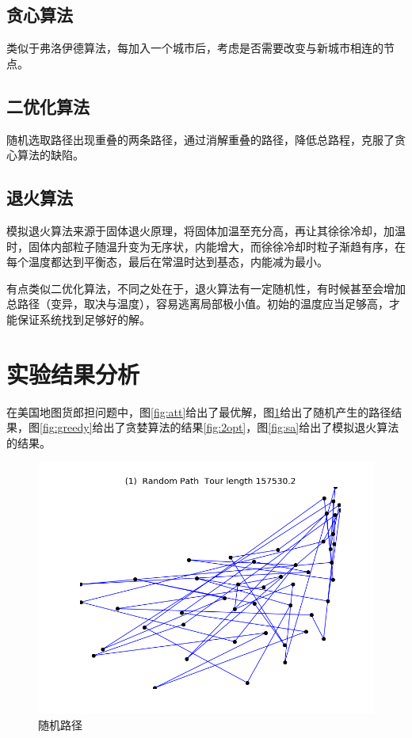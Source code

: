 \documentclass{article}
\newcommand{\huo}{货郎担问题}
\begin{document}
\begin{CJK}{UTF8}{gkai}
\subsection{贪心算法}
类似于弗洛伊德算法，每加入一个城市后，考虑是否需要改变与新城市相连的节点。\cite{gutin2007greedy}


\subsection{二优化算法}
随机选取路径出现重叠的两条路径，通过消解重叠的路径，降低总路程，克服了贪心算法的缺陷。\cite{croes1958method}


\subsection{退火算法}
模拟退火算法来源于固体退火原理，将固体加温至充分高，再让其徐徐冷却，加温时，固体内部粒子随温升变为无序状，内能增大，而徐徐冷却时粒子渐趋有序，在每个温度都达到平衡态，最后在常温时达到基态，内能减为最小。

有点类似二优化算法，不同之处在于，退火算法有一定随机性，有时候甚至会增加总路径（变异，取决与温度），容易逃离局部极小值。初始的温度应当足够高，才能保证系统找到足够好的解。\cite{grefenstette1985genetic}



\section{实验结果分析}
	在美国地图\huo 中，图\ref{fig:att}给出了最优解，图\ref{fig:rand}给出了随机产生的路径结果，图\ref{fig:greedy}给出了贪婪算法的结果\ref{fig:2opt}，图\ref{fig:sa}给出了模拟退火算法的结果。
\begin{figure}[!h]
	\centering
	\includegraphics[width=.7\linewidth]{00074}
	\caption{随机路径}
	\label{fig:rand}
\end{figure}


\end{CJK}
\end{document}
